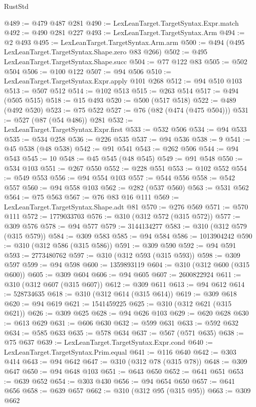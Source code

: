 \begin{lexlean}{RustStd}
\begin{coremodule}
{\begin{coremodule}
{{{{{{{{{{{{{{{{{{{{{{{{{{{{{{{{{{{{{@489 := @479 @487 @281
@490 := LexLeanTarget.TargetSyntax.Expr.match
@492 := @490 @281 @227
@493 := LexLeanTarget.TargetSyntax.Arm
@494 := @2 @493
@495 := LexLeanTarget.TargetSyntax.Arm.arm
@500 := @494 (@495 LexLeanTarget.TargetSyntax.Shape.zero @83 @266)
@502 := @495 LexLeanTarget.TargetSyntax.Shape.succ
@504 := @77 @122 @83
@505 := @502 @504
@506 := @100 @122
@507 := @94 @506
@510 := LexLeanTarget.TargetSyntax.Expr.apply @101 @268
@512 := @94 @510 @103
@513 := @507 @512
@514 := @102 @513
@515 := @263 @514
@517 := @494 (@505 @515)
@518 := @15 @493
@520 := @500 (@517 @518)
@522 := @489 (@492 @520)
@523 := @75 @522
@527 := @76 (@82 (@474 (@475 @504)))
@531 := @527 (@87 (@54 @486)) @281
@532 := LexLeanTarget.TargetSyntax.Expr.first
@533 := @532 @506
@534 := @94 @533
@535 := @534 @258
@536 := @226 @535
@537 := @94 @536
@538 := 9
@541 := @45 @538 (@48 @538)
@542 := @91 @541
@543 := @262 @506
@544 := @94 @543
@545 := 10
@548 := @45 @545 (@48 @545)
@549 := @91 @548
@550 := @534 @103
@551 := @267 @550
@552 := @228 @551
@553 := @102 @552
@554 := @549 @553
@556 := @94 @554 @103
@557 := @544 @556
@558 := @542 @557
@560 := @94 @558 @103
@562 := @282 (@537 @560)
@563 := @531 @562
@564 := @75 @563
@567 := @76 @83 @16 @111
@569 := LexLeanTarget.TargetSyntax.Shape.adt @81
@570 := @276 @569
@571 := @570 @111
@572 := 1779033703
@576 := @310 (@312 @572 (@315 @572))
@577 := @309 @576
@578 := @94 @577
@579 := 3144134277
@583 := @310 (@312 @579 (@315 @579))
@584 := @309 @583
@585 := @94 @584
@586 := 1013904242
@590 := @310 (@312 @586 (@315 @586))
@591 := @309 @590
@592 := @94 @591
@593 := 2773480762
@597 := @310 (@312 @593 (@315 @593))
@598 := @309 @597
@599 := @94 @598
@600 := 1359893119
@604 := @310 (@312 @600 (@315 @600))
@605 := @309 @604
@606 := @94 @605
@607 := 2600822924
@611 := @310 (@312 @607 (@315 @607))
@612 := @309 @611
@613 := @94 @612
@614 := 528734635
@618 := @310 (@312 @614 (@315 @614))
@619 := @309 @618
@620 := @94 @619
@621 := 1541459225
@625 := @310 (@312 @621 (@315 @621))
@626 := @309 @625
@628 := @94 @626 @103
@629 := @620 @628
@630 := @613 @629
@631 := @606 @630
@632 := @599 @631
@633 := @592 @632
@634 := @585 @633
@635 := @578 @634
@637 := @567 (@571 @635)
@638 := @75 @637
@639 := LexLeanTarget.TargetSyntax.Expr.cond
@640 := LexLeanTarget.TargetSyntax.Prim.equal
@641 := @116 @640
@642 := @303 @414
@643 := @94 @642
@647 := @310 (@312 @78 (@315 @78))
@648 := @309 @647
@650 := @94 @648 @103
@651 := @643 @650
@652 := @641 @651
@653 := @639 @652
@654 := @303 @430
@656 := @94 @654 @650
@657 := @641 @656
@658 := @639 @657
@662 := @310 (@312 @95 (@315 @95))
@663 := @309 @662
}}}}}}}}}}}}}}}}}}}}}}}}}}}}}}}}}}}}}
\end{coremodule}}
\end{coremodule}
\end{lexlean}
